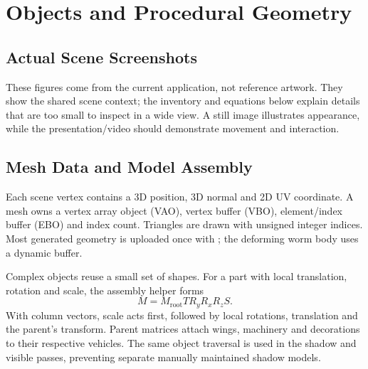 \section{Objects and Procedural Geometry}
\subsection{Actual Scene Screenshots}
These figures come from the current application, not reference artwork. They show the shared scene context; the inventory and equations below explain details that are too small to inspect in a wide view. A still image illustrates appearance, while the presentation/video should demonstrate movement and interaction.
\clearpage
{}
\clearpage

\subsection{Mesh Data and Model Assembly}
Each scene vertex contains a 3D position, 3D normal and 2D UV coordinate. A mesh owns a vertex array object (VAO), vertex buffer (VBO), element/index buffer (EBO) and index count. Triangles are drawn with unsigned integer indices. Most generated geometry is uploaded once with ; the deforming worm body uses a dynamic buffer.

Complex objects reuse a small set of shapes. For a part with local translation, rotation and scale, the assembly helper forms
\begin{equation}
M=M_{\mathrm{root}}T R_y R_x R_z S.
\end{equation}
With column vectors, scale acts first, followed by local rotations, translation and the parent's transform. Parent matrices attach wings, machinery and decorations to their respective vehicles. The same object traversal is used in the shadow and visible passes, preventing separate manually maintained shadow models.

